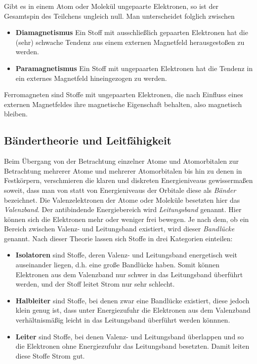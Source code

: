 \documentclass{scrartcl}
\begin{document}
Gibt es in einem Atom oder Molekül ungepaarte Elektronen, so ist der Gesamtspin des Teilchens ungleich null. Man unterscheidet folglich zwischen
\begin{itemize}
	\item \textbf{Diamagnetismus} Ein Stoff mit ausschließlich gepaarten Elektronen hat die (sehr) schwache Tendenz aus einem externen Magnetfeld herausgestoßen zu werden.
	\item \textbf{Paramagnetismus} Ein Stoff mit ungepaarten Elektronen hat die Tendenz in ein externes Magnetfeld hineingezogen zu werden. 
\end{itemize}
Ferromagneten sind Stoffe mit ungepaarten Elektronen, die nach Einfluss eines externen Magnetfeldes ihre magnetische Eigenschaft behalten, also magnetisch bleiben.

\subsection{Bändertheorie und Leitfähigkeit}
Beim Übergang von der Betrachtung einzelner Atome und Atomorbitalen zur Betrachtung mehrerer Atome und mehrerer Atomorbitalen bis hin zu denen in Festkörpern, verschmieren die klaren und diskreten Energieniveaus gewissermaßen soweit, dass man von statt von Energieniveaus der Orbitale diese als \emph{Bänder} bezeichnet. Die Valenzelektronen der Atome oder Moleküle besetzten hier das \emph{Valenzband}. Der antibindende Energiebereich wird \emph{Leitungsband} genannt. Hier können sich die Elektronen mehr oder weniger frei bewegen. Je nach dem, ob ein Bereich zwischen Valenz- und Leitungsband existiert, wird dieser \emph{Bandlücke} genannt. Nach dieser Theorie lassen sich Stoffe in drei Kategorien einteilen:
\begin{itemize}
	\item \textbf{Isolatoren} sind Stoffe, deren Valenz- und Leitungsband energetisch weit auseinander liegen, d.h. eine große Bandlücke haben. Somit können Elektronen aus dem Valenzband nur schwer in das Leitungsband überführt werden, und der Stoff leitet Strom nur sehr schlecht.
	\item \textbf{Halbleiter} sind Stoffe, bei denen zwar eine Bandlücke existiert, diese jedoch klein genug ist, dass unter Energiezufuhr die Elektronen aus dem Valenzband verhältnismäßig leicht in das Leitungsband überführt werden könnnen.
	\item \textbf{Leiter} sind Stoffe, bei denen Valenz- und Leitungsband überlappen und so die Elektronen ohne Energiezufuhr das Leitungsband besetzten. Damit leiten diese Stoffe Strom gut. 
\end{itemize}
\end{document}
